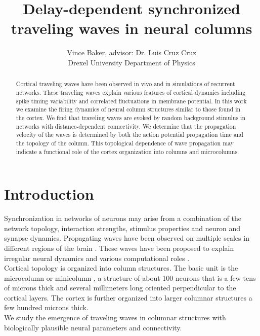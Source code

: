 \documentclass[a4paper,11pt]{article}
\title{Delay-dependent synchronized traveling waves in neural columns}
\author{Vince Baker, advisor: Dr. Luis Cruz Cruz\\ Drexel University Department of Physics}
\begin{document}
\maketitle

\begin{abstract}
Cortical traveling waves have been observed in vivo and in simulations of recurrent networks.
These traveling waves explain various features of cortical dynamics including spike timing variability and correlated fluctuations in membrane potential.
In this work we examine the firing dynamics of neural column structures similar to those found in the cortex.
We find that traveling waves are evoked by random background stimulus in networks with distance-dependent connectivity.
We determine that the propagation velocity of the waves is determined by both the action potential propagation time and the topology of the column.
This topological dependence of wave propagation may indicate a functional role of the cortex organization into columns and microcolumns.

\end{abstract}

\section{Introduction} 
Synchronization in networks of neurons may arise from a combination of the network topology, interaction strengths, stimulus properties and neuron and synapse dynamics.
Propagating waves have been observed on multiple scales in different regions of the brain \cite{muller2018}.
These waves have been proposed to explain irregular neural dynamics \cite{keane2015} and various computational roles \cite{muller2018}. 
\\
Cortical topology is organized into column structures. 
The basic unit is the microcolumn or minicolumn \cite{cruz2005}, a structure of about 100 neurons that is a few tens of microns thick and several millimeters long oriented perpendicular to the cortical layers.
The cortex is further organized into larger columnar structures a few hundred microns thick. 
\\
We study the emergence of traveling waves in columnar structures with biologically plausible neural parameters and connectivity.
\end{document}
